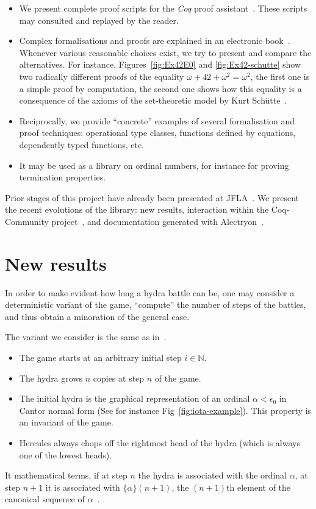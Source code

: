 \documentclass{easychair}
\newcommand{\canonseq}[2]{\mbox{$\{#1\}(#2)$}}
\begin{document}
\begin{itemize}
\item We present complete proof scripts for the \textit{Coq} proof assistant~\cite{Coq}. These scripts may consulted and replayed by the reader.
\item Complex formalisations and proofs are explained in an
  electronic book~\cite{HydraBook}. Whenever various reasonable choices exist, we try to present and compare the alternatives.
  For instance, Figures~\vref{fig:Ex42E0} and \vref{fig:Ex42-schutte} show two radically different proofs of the equality
  $\omega+42+\omega^2=\omega^2$, the first one is a simple proof by computation, the second one shows how this equality
  is a consequence of the axioms of the set-theoretic model  by Kurt Schütte~\cite{schutte}. 
\item
  Reciprocally, we provide ``concrete'' examples of several formalisation and proof techniques: operational type classes, functions defined by  equations, dependently typed functions, etc.
\item It may be used as a library on ordinal numbers, for instance for proving termination properties.
  \end{itemize}

 Prior stages of this project have already been presented at
 JFLA~\cite{PCiota, JFLA2018paper}.
We present the recent evolutions of the library: new results, interaction within the Coq-Community project~\cite{CoqCommunity}, and documentation generated with Alectryon~\cite{alectryonpaper, alectryongithub}.

\section{New results}
In order to make evident how long a hydra battle can be,
one may consider a deterministic variant of the game,
``compute'' the number of steps of the battles, and thus obtain a minoration of the general case.

The variant we consider is the same as 
in~\cite{KP82, bauer2008, BauerHydra}. 


 \begin{itemize}
 \item The game starts at an arbitrary initial step $i\in\mathbb{N}$.
   
   \item The hydra grows $n$ copies at step $n$ of the game.
   \item  The initial hydra is the graphical representation of an ordinal  $\alpha<\epsilon_0$  in Cantor normal form (See for instance Fig~\ref{fig:iota-example}). This property is an invariant of the game.
 \item Hercules always chops off the rightmost head of the hydra (which is always one of the lowest heads).
 \end{itemize}
 It mathematical terms, if at step $n$ the hydra is associated with the ordinal $\alpha$, at step $n+1$ it is associated with
 $\canonseq{\alpha}{n+1}$, the $(n+1)$th element of the canonical sequence of $\alpha$~\cite{KS81}.
 
\end{document}
